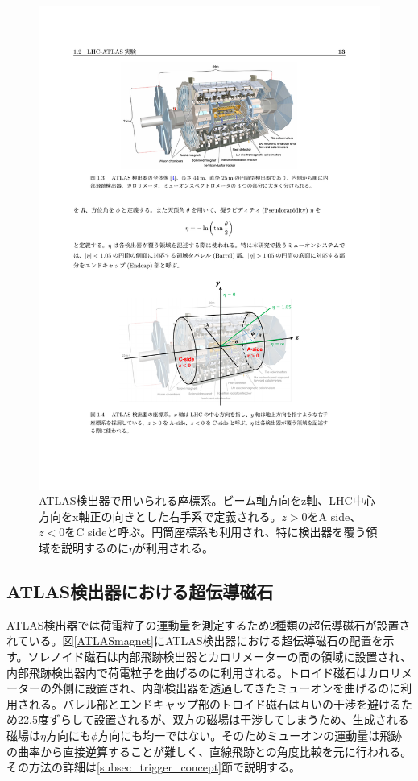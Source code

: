     \begin{figure} 
    \centering
    \includegraphics[width=16cm]{fig/Intro/ATLAScordination.pdf}
    \caption[ATLAS検出器における座標系]{ATLAS検出器で用いられる座標系。ビーム軸方向をz軸、LHC中心方向をx軸正の向きとした右手系で定義される。$z>0$をA side、$z<0$をC sideと呼ぶ。円筒座標系も利用され、特に検出器を覆う領域を説明するのに$\eta$が利用される。}
    \label{ATLAScordination}
    \end{figure}
  
    \subsection{ATLAS検出器における超伝導磁石}
    ATLAS検出器では荷電粒子の運動量を測定するため2種類の超伝導磁石が設置されている。図\ref{ATLASmagnet}にATLAS検出器における超伝導磁石の配置を示す。ソレノイド磁石は内部飛跡検出器とカロリメーターの間の領域に設置され、内部飛跡検出器内で荷電粒子を曲げるのに利用される。トロイド磁石はカロリメーターの外側に設置され、内部検出器を透過してきたミューオンを曲げるのに利用される。バレル部とエンドキャップ部のトロイド磁石は互いの干渉を避けるため22.5度ずらして設置されるが、双方の磁場は干渉してしまうため、生成される磁場は$\eta$方向にも$\phi$方向にも均一ではない。そのためミューオンの運動量は飛跡の曲率から直接逆算することが難しく、直線飛跡との角度比較を元に行われる。その方法の詳細は\ref{subsec_trigger_concept}節で説明する。

